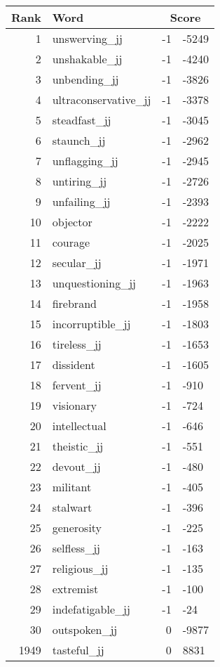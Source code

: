 \begin{longtable}[!htbp]{| rlr@{.}l |}
    \hline
    \textbf{Rank} & \textbf{Word} & \multicolumn{2}{c|}{\textbf{Score}} \\
    \hline
    \endhead
    1 & unswerving\_jj & -1 & -5249 \\
    2 & unshakable\_jj & -1 & -4240 \\
    3 & unbending\_jj & -1 & -3826 \\
    4 & ultraconservative\_jj & -1 & -3378 \\
    5 & steadfast\_jj & -1 & -3045 \\
    6 & staunch\_jj & -1 & -2962 \\
    7 & unflagging\_jj & -1 & -2945 \\
    8 & untiring\_jj & -1 & -2726 \\
    9 & unfailing\_jj & -1 & -2393 \\
    10 & objector & -1 & -2222 \\
    11 & courage & -1 & -2025 \\
    12 & secular\_jj & -1 & -1971 \\
    13 & unquestioning\_jj & -1 & -1963 \\
    14 & firebrand & -1 & -1958 \\
    15 & incorruptible\_jj & -1 & -1803 \\
    16 & tireless\_jj & -1 & -1653 \\
    17 & dissident & -1 & -1605 \\
    18 & fervent\_jj & -1 & -910 \\
    19 & visionary & -1 & -724 \\
    20 & intellectual & -1 & -646 \\
    21 & theistic\_jj & -1 & -551 \\
    22 & devout\_jj & -1 & -480 \\
    23 & militant & -1 & -405 \\
    24 & stalwart & -1 & -396 \\
    25 & generosity & -1 & -225 \\
    26 & selfless\_jj & -1 & -163 \\
    27 & religious\_jj & -1 & -135 \\
    28 & extremist & -1 & -100 \\
    29 & indefatigable\_jj & -1 & -24 \\
    30 & outspoken\_jj & 0 & -9877 \\
    1949 & tasteful\_jj & 0 & 8831 \\

\end{longtable}
